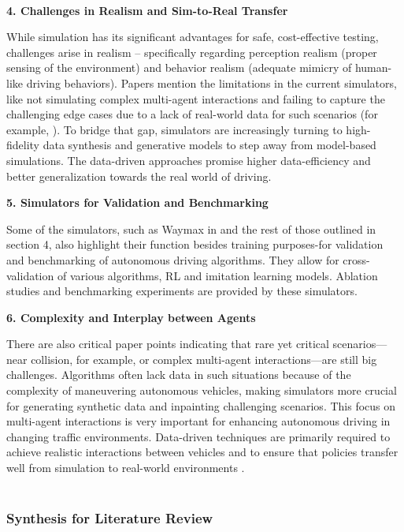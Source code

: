 \documentclass[lettersize,journal]{IEEEtran}
\newcommand{\subsubsubsection}[1]{%
    \par\medskip
    \noindent\textbf{#1}
    \par\medskip
}
\begin{document}
\\
\subsubsubsection{4. Challenges in Realism and Sim-to-Real Transfer}
While simulation has its significant advantages for safe, cost-effective testing, challenges arise in realism -- specifically regarding perception realism (proper sensing of the environment) and behavior realism (adequate mimicry of human-like driving behaviors).
Papers mention the limitations in the current simulators, like not simulating complex multi-agent interactions and failing to capture the challenging edge cases due to a lack of real-world data for such scenarios (for example, \cite{ref5}).
To bridge that gap, simulators are increasingly turning to high-fidelity data synthesis and generative models to step away from model-based simulations. The data-driven approaches promise higher data-efficiency and better generalization towards the real world of driving.
\\
\subsubsubsection{5. Simulators for Validation and Benchmarking}
Some of the simulators, such as Waymax in \cite{ref4} and the rest of those outlined in section 4, also highlight their function besides training purposes-for validation and benchmarking of autonomous driving algorithms.
They allow for cross-validation of various algorithms, RL and imitation learning models. Ablation studies and benchmarking experiments are provided by these simulators.
\\
\subsubsubsection{6. Complexity and Interplay between Agents}
There are also critical paper points indicating that rare yet critical scenarios—near collision, for example, or complex multi-agent interactions—are still big challenges. Algorithms often lack data in such situations because of the complexity of maneuvering autonomous vehicles, making simulators more crucial for generating synthetic data and inpainting challenging scenarios.
This focus on multi-agent interactions is very important for enhancing autonomous driving in changing traffic environments. Data-driven techniques are primarily required to achieve realistic interactions between vehicles and to ensure that policies transfer well from simulation to real-world environments \cite{ref5}.
\\
\\



\subsubsection{Synthesis for Literature Review}
\end{document}
